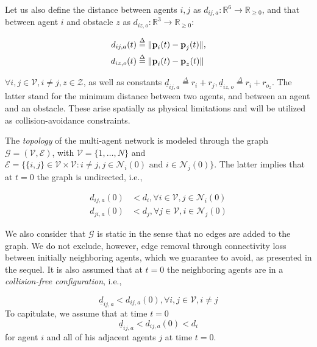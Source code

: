 Let us also define the distance between agents $i,j$ as
$d_{ij,a}: \mathbb{R}^6 \to \mathbb{R}_{\geq 0}$, and that between agent $i$
and obstacle $z$ as $d_{iz,o} : \mathbb{R}^3 \to \mathbb{R}_{\geq 0}$:

\begin{subequations}
	\begin{align}
    d_{ij,a}(t) &\overset{\Delta}{=} \| \bm{\mathbf{p}}_i(t) - \bm{\mathbf{p}}_j(t) \|, \\
    d_{iz,o}(t) &\overset{\Delta}{=} \| \bm{\mathbf{p}}_i(t) - \bm{\mathbf{p}}_z(t) \|
	\end{align}
\end{subequations}

$\forall i, j \in \mathcal{V}, i \neq j, z \in \mathcal{Z}$, as well as
constants $\underline{d}_{ij, a} \overset{\Delta}{=} r_{i} + r_{j},
\underline{d}_{iz, o} \overset{\Delta}{=} r_{i} + r_{o_z}$. The latter stand for the minimum
distance between two agents, and between an agent and an obstacle. These arise
spatially as physical limitations and will be utilized as collision-avoidance
constraints.

The \textit{topology} of the multi-agent network is modeled through the graph
$\mathcal{G} = (\mathcal{V},\mathcal{E})$, with $\mathcal{V}=\{1,\dots,N\}$ and
$\mathcal{E}=\big\{\{i,j\}\in\mathcal{V}\times\mathcal{V} : i \neq j, j\in\mathcal{N}_i(0) \text{ and } i\in\mathcal{N}_j(0)\big\}$.
The latter implies that at $t=0$ the graph is undirected, i.e.,

\begin{align}
  d_{ij,a}(0) &< d_i, \forall i \in \mathcal{V}, j \in \mathcal{N}_i(0) \\
  d_{ji,a}(0) &< d_j, \forall j \in \mathcal{V}, i \in \mathcal{N}_j(0)
\label{eq:initially_connected}
\end{align}

We also consider that $\mathcal{G}$ is static in the sense that no edges are
added to the graph. We do not exclude, however, edge removal through
connectivity loss between initially neighboring agents, which we guarantee
to avoid, as presented in the sequel. It is also assumed that at $t=0$ the
neighboring agents are in a \textit{collision-free configuration}, i.e.,

\begin{equation}
  \underline{d}_{ij, a} < d_{ij,a}(0), \forall i,j \in \mathcal{V}, i \neq j
\label{eq:initially_coll_free}
\end{equation}
To capitulate, we assume that at time $t=0$
$$\underline{d}_{ij,a} < d_{ij,a}(0) < d_i$$
for agent $i$ and all of his adjacent agents $j$ at time $t=0$.

